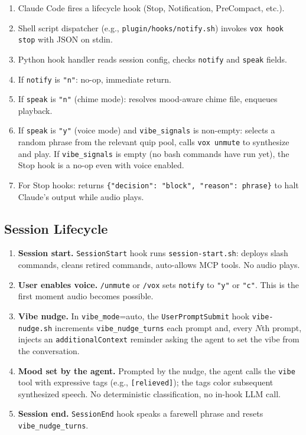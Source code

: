 \documentclass[a4paper,10pt]{article}
\newcommand{\tool}[1]{\texttt{#1}}
\newcommand{\field}[1]{\texttt{#1}}
\newcommand{\hook}[1]{\texttt{#1}}
\newcommand{\cmd}[1]{\texttt{/#1}}
\begin{document}
\begin{enumerate}
  \item Claude Code fires a lifecycle hook (Stop, Notification,
    PreCompact, etc.).
  \item Shell script dispatcher (e.g., \texttt{plugin/hooks/notify.sh})
    invokes \texttt{vox hook stop} with JSON on stdin.
  \item Python hook handler reads session config, checks
    \field{notify} and \field{speak} fields.
  \item If \field{notify} is \texttt{"n"}: no-op, immediate return.
  \item If \field{speak} is \texttt{"n"} (chime mode): resolves
    mood-aware chime file, enqueues playback.
  \item If \field{speak} is \texttt{"y"} (voice mode) and
    \field{vibe\_signals} is non-empty: selects a random phrase
    from the relevant quip pool, calls \texttt{vox unmute} to
    synthesize and play.  If \field{vibe\_signals} is empty
    (no bash commands have run yet), the Stop hook is a no-op
    even with voice enabled.
  \item For Stop hooks: returns
    \texttt{\{"decision": "block", "reason": phrase\}} to halt
    Claude's output while audio plays.
\end{enumerate}

\subsection{Session Lifecycle}

\begin{enumerate}
  \item \textbf{Session start.}  \hook{SessionStart} hook runs
    \texttt{session-start.sh}: deploys slash commands, cleans
    retired commands, auto-allows MCP tools.  No audio plays.
  \item \textbf{User enables voice.}  \cmd{unmute} or \cmd{vox}
    sets \field{notify} to \texttt{"y"} or \texttt{"c"}.  This
    is the first moment audio becomes possible.
  \item \textbf{Vibe nudge.}  In \field{vibe\_mode}=auto, the
    \hook{UserPromptSubmit} hook \texttt{vibe-nudge.sh} increments
    \field{vibe\_nudge\_turns} each prompt and, every $N$th prompt,
    injects an \texttt{additionalContext} reminder asking the agent
    to set the vibe from the conversation.
  \item \textbf{Mood set by the agent.}  Prompted by the nudge, the
    agent calls the \tool{vibe} tool with expressive tags (e.g.,
    \texttt{[relieved]}); the tags color subsequent synthesized
    speech.  No deterministic classification, no in-hook LLM call.
  \item \textbf{Session end.}  \hook{SessionEnd} hook speaks a
    farewell phrase and resets \field{vibe\_nudge\_turns}.
\end{enumerate}
\end{document}
